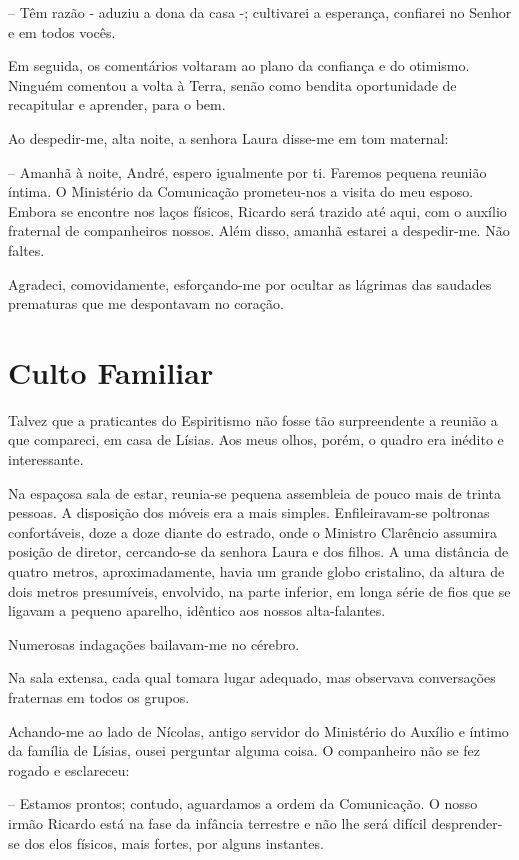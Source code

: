 \documentclass[portuguese,12pt,a4paper]{scrbook}
\begin{document}
	
	– Têm razão - aduziu a dona da casa -; cultivarei a esperança, confiarei no Senhor e em todos vocês.
	
	Em seguida, os comentários voltaram ao plano da confiança e do otimismo. Ninguém comentou a volta à Terra, senão como bendita oportunidade de recapitular e aprender, para o bem.
	
	Ao despedir-me, alta noite, a senhora Laura disse-me em tom maternal:
	
	– Amanhã à noite, André, espero igualmente por ti. Faremos pequena reunião íntima. O Ministério da Comunicação prometeu-nos a visita do meu esposo. Embora se encontre nos laços físicos, Ricardo será trazido até aqui, com o auxílio fraternal de companheiros nossos. Além disso, amanhã estarei a despedir-me. Não faltes.
	
	Agradeci, comovidamente, esforçando-me por ocultar as lágrimas das saudades prematuras que me despontavam no coração.
	
	
	\chapter{Culto Familiar}
	
	Talvez que a praticantes do Espiritismo não fosse tão surpreendente a reunião a que compareci, em casa de Lísias. Aos meus olhos, porém, o quadro era inédito e interessante.
	
	Na espaçosa sala de estar, reunia-se pequena assembleia de pouco mais de trinta pessoas. A disposição dos móveis era a mais simples. Enfileiravam-se poltronas confortáveis, doze a doze diante do estrado, onde o Ministro Clarêncio assumira posição de diretor, cercando-se da senhora Laura e dos filhos. A uma distância de quatro metros, aproximadamente, havia um grande globo cristalino, da altura de dois metros presumíveis, envolvido, na parte inferior, em longa série de fios que se ligavam a pequeno aparelho, idêntico aos nossos alta-falantes.
	
	Numerosas indagações bailavam-me no cérebro.
	
	Na sala extensa, cada qual tomara lugar adequado, mas observava conversações fraternas em todos os grupos.
	
	Achando-me ao lado de Nícolas, antigo servidor do Ministério do Auxílio e íntimo da família de Lísias, ousei perguntar alguma coisa. O companheiro não se fez rogado e esclareceu:
	
	– Estamos prontos; contudo, aguardamos a ordem da Comunicação. O nosso irmão Ricardo está na fase da infância terrestre e não lhe será difícil desprender-se dos elos físicos, mais fortes, por alguns instantes.
	
\end{document}
